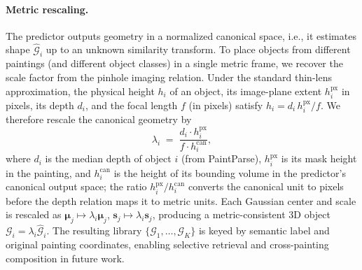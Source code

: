 \paragraph{Metric rescaling.}
The predictor outputs geometry in a normalized canonical space, i.e.,
it estimates shape $\widehat{\mathcal{G}}_i$ up to an unknown similarity
transform. To place objects from different paintings (and different
object classes) in a single metric frame, we recover the scale factor
from the pinhole imaging relation. Under the standard thin-lens
approximation, the physical height $h_i$ of an object, its image-plane
extent $h_i^{\mathrm{px}}$ in pixels, its depth $d_i$, and the focal
length $f$ (in pixels) satisfy
$h_i = d_i \, h_i^{\mathrm{px}} / f$. We therefore rescale the
canonical geometry by
\begin{equation}
    \lambda_i \;=\; \frac{d_i \cdot h_i^{\mathrm{px}}}{f \cdot
    h_i^{\mathrm{can}}},
    \label{eq:metric_scale}
\end{equation}
where $d_i$ is the median depth of object $i$ (from PaintParse),
$h_i^{\mathrm{px}}$ is its mask height in the painting, and
$h_i^{\mathrm{can}}$ is the height of its bounding volume in the
predictor's canonical output space; the ratio
$h_i^{\mathrm{px}}/h_i^{\mathrm{can}}$ converts the canonical unit to
pixels before the depth relation maps it to metric units. Each Gaussian
center and scale is rescaled as
$\boldsymbol{\mu}_j \mapsto \lambda_i \boldsymbol{\mu}_j$,
$\mathbf{s}_j \mapsto \lambda_i \mathbf{s}_j$, producing a
metric-consistent 3D object $\mathcal{G}_i =
\lambda_i \widehat{\mathcal{G}}_i$. The resulting library
$\{\mathcal{G}_1, \dots, \mathcal{G}_K\}$ is keyed by semantic label
and original painting coordinates, enabling selective retrieval and
cross-painting composition in future work.

